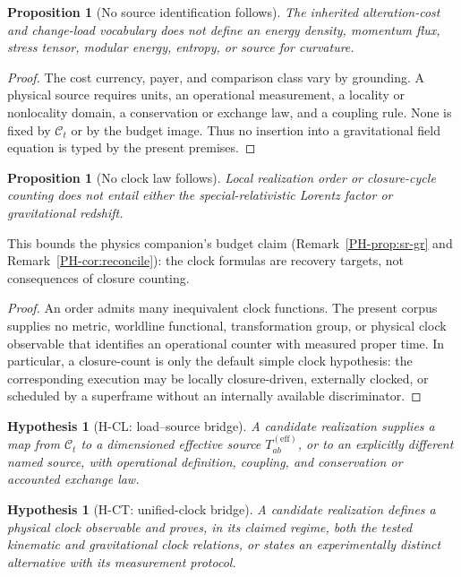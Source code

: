 \documentclass[11pt,a4paper]{article}
\newtheorem{proposition}[definition]{Proposition}
\newtheorem{hypothesis}[definition]{Hypothesis}
\theoremstyle{remark}
\newcommand{\Load}{\mathcal C}
\begin{document}
\begin{proposition}[No source identification follows]\label{prop:no-source}
The inherited alteration-cost and change-load vocabulary does not define an
energy density, momentum flux, stress tensor, modular energy, entropy, or source
for curvature.
\end{proposition}
\begin{proof}
The cost currency, payer, and comparison class vary by grounding. A physical
source requires units, an operational measurement, a locality or nonlocality
domain, a conservation or exchange law, and a coupling rule. None is fixed by
$\Load_t$ or by the budget image. Thus no insertion into a gravitational field
equation is typed by the present premises.
\end{proof}

\begin{proposition}[No clock law follows]\label{prop:no-clock-law}
Local realization order or closure-cycle counting does not entail either the
special-relativistic Lorentz factor or gravitational redshift.
\end{proposition}
This bounds the physics companion's budget claim
(Remark~\ref{PH-prop:sr-gr} and Remark~\ref{PH-cor:reconcile}): the
clock formulas are recovery targets, not consequences of closure counting.


\begin{proof}
An order admits many inequivalent clock functions. The present corpus supplies
no metric, worldline functional, transformation group, or physical clock
observable that identifies an operational counter with measured proper time. In
particular, a closure-count is only the default simple clock hypothesis: the
corresponding execution may be locally closure-driven, externally clocked, or
scheduled by a superframe without an internally available discriminator.
\end{proof}

\begin{hypothesis}[H-CL: load--source bridge]\label{hyp:load-source}
A candidate realization supplies a map from $\Load_t$ to a dimensioned effective
source $T_{ab}^{(\mathrm{eff})}$, or to an explicitly different named source,
with operational definition, coupling, and conservation or accounted exchange
law.
\end{hypothesis}
\begin{hypothesis}[H-CT: unified-clock bridge]\label{hyp:clock}
A candidate realization defines a physical clock observable and proves, in its
claimed regime, both the tested kinematic and gravitational clock relations, or
states an experimentally distinct alternative with its measurement protocol.
\end{hypothesis}
\end{document}
